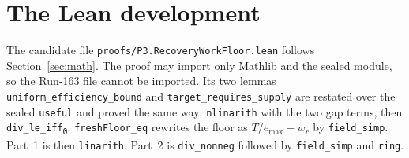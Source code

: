 \documentclass[11pt]{article}
\theoremstyle{definition}
\theoremstyle{remark}
\begin{document}
\section{The Lean development}
\label{sec:proof}
The candidate file \texttt{proofs/P3.RecoveryWorkFloor.lean} follows Section~\ref{sec:math}. The
proof may import only Mathlib and the sealed module, so the Run-163 file cannot be imported. Its
two lemmas \texttt{uniform\_efficiency\_bound} and \texttt{target\_requires\_supply} are restated
over the sealed \texttt{useful} and proved the same way: \texttt{nlinarith} with the two gap terms,
then \texttt{div\_le\_iff\textsubscript{0}}. \texttt{freshFloor\_eq} rewrites the floor as
$T/e_{\max}-w_r$ by \texttt{field\_simp}. Part~1 is then \texttt{linarith}. Part~2 is
\texttt{div\_nonneg} followed by \texttt{field\_simp} and \texttt{ring}.
\end{document}
